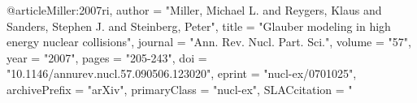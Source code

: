 @article{Miller:2007ri,
      author         = "Miller, Michael L. and Reygers, Klaus and Sanders,
                        Stephen J. and Steinberg, Peter",
      title          = "{Glauber modeling in high energy nuclear collisions}",
      journal        = "Ann. Rev. Nucl. Part. Sci.",
      volume         = "57",
      year           = "2007",
      pages          = "205-243",
      doi            = "10.1146/annurev.nucl.57.090506.123020",
      eprint         = "nucl-ex/0701025",
      archivePrefix  = "arXiv",
      primaryClass   = "nucl-ex",
      SLACcitation   = "%
}